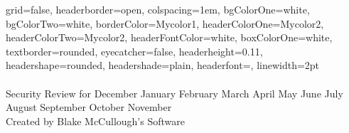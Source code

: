 \documentclass[a0paper,landscape]{baposter}
\newcommand{\lastmonth}{%
  \ifcase\month\or%
    December\or   %
    January\or    %
    February\or   %
    March\or      %
    April\or      %
    May\or        %
    June\or       %
    July\or       %
    August\or     %
    September\or  %
    October\or    %
    November\fi   %
}
\begin{document}

\begin{poster}
{
grid=false,
headerborder=open, %
colspacing=1em, %
bgColorOne=white, %
bgColorTwo=white, %
borderColor=Mycolor1, %
headerColorOne=Mycolor2, %
headerColorTwo=Mycolor2, %
headerFontColor=white, %
boxColorOne=white, %
textborder=rounded, %
eyecatcher=false, %
headerheight=0.11\textheight, %
headershape=rounded, %
headershade=plain,
headerfont=\Large\textsf, %
linewidth=2pt %
}{}
{
\textsf %
{\vspace{0.3em}\\
{}
}
} %
{\sf\vspace{0.2em}\\
Security Review for \lastmonth %
\vspace{0.3em}\\
\small{ Created by Blake McCullough's Software %
\vspace{0.2em}\\

}}
\end{poster}
\end{document}
